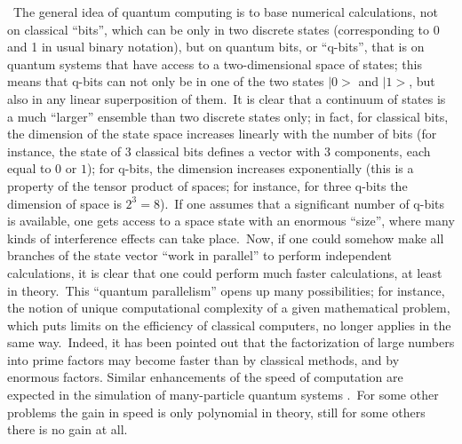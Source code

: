 \documentclass[12pt,onecolumn]{article}%
\begin{document}
\ The general idea of quantum computing \cite{Deutsch} is to base numerical
calculations, not on classical ``bits'', which can be only in two discrete
states (corresponding to 0 and 1 in usual binary notation), but on quantum
bits, or ``q-bits'', that is on quantum systems that have access to a
two-dimensional space of states; this means that q-bits can not only be in one
of the two states $\mid0>$ and $\mid1>$, but also in any linear superposition
of them.\ It is clear that a continuum of states is a much ``larger'' ensemble
than two discrete states only; in fact, for classical bits, the dimension of
the state space increases linearly with the number of bits (for instance, the
state of 3 classical bits defines a vector with 3 components, each equal to
$0$ or $1$); for q-bits, the dimension increases exponentially (this is a
property of the tensor product of spaces; for instance, for three q-bits the
dimension of space is $2^{3}=8$).\ If one assumes that a significant number of
q-bits is available, one gets access to a space state with an enormous
``size'', where many kinds of interference effects can take place.\ Now, if
one could somehow make all branches of the state vector ``work in parallel''
to perform independent calculations, it is clear that one could perform much
faster calculations, at least in theory.\ This ``quantum parallelism'' opens
up many possibilities; for instance, the notion of unique computational
complexity of a given mathematical problem, which puts limits on the
efficiency of classical computers, no longer applies in the same way.\ Indeed,
it has been pointed out \cite{Shor} that the factorization of large numbers
into prime factors may become faster than by classical methods, and by
enormous factors. Similar enhancements of the speed of computation are
expected in the simulation of many-particle quantum systems \cite{Abrams}%
.\ For some other problems the gain in speed is only polynomial in theory,
still for some others there is no gain at all.
\end{document}
